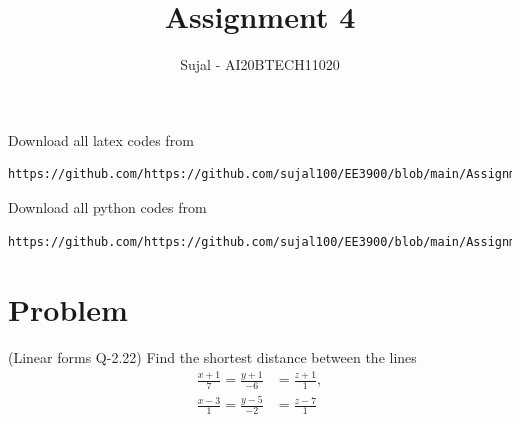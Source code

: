 \documentclass[journal,12pt,twocolumn]{IEEEtran}
\begin{document}
\let\StandardTheFigure\thefigure
\let\vec\mathbf
\renewcommand{\thefigure}{\theproblem}
\def\putbox#1#2#3{\makebox[0in][l]{\makebox[#1][l]{}\raisebox{\baselineskip}[0in][0in]{\raisebox{#2}[0in][0in]{#3}}}}
     \def\rightbox#1{\makebox[0in][r]{#1}}
     \def\centbox#1{\makebox[0in]{#1}}
     \def\topbox#1{\raisebox{-\baselineskip}[0in][0in]{#1}}
     \def\midbox#1{\raisebox{-0.5\baselineskip}[0in][0in]{#1}}
\vspace{3cm}
\title{Assignment 4}
\author{Sujal - AI20BTECH11020}
\maketitle
\newpage
\bigskip
\renewcommand{\thefigure}{\theenumi}
\renewcommand{\thetable}{\theenumi}
Download all latex codes from 

\begin{lstlisting}
https://github.com/https://github.com/sujal100/EE3900/blob/main/Assignment4/Assignment4.tex
\end{lstlisting}

Download all python codes from 

\begin{lstlisting}
https://github.com/https://github.com/sujal100/EE3900/blob/main/Assignment4/codes/code.py
\end{lstlisting}
\section{Problem}
(Linear forms Q-2.22) Find the shortest distance between the lines 
\begin{align}
\frac{x+1}{7} = \frac{y+1}{-6} &= \frac{z+1}{1}, 
\\
\frac{x-3}{1} = \frac{y-5}{-2} &= \frac{z-7}{1} 
\end{align}
\end{document}

